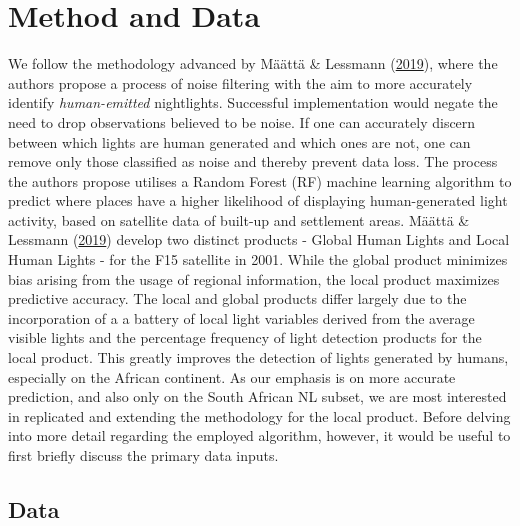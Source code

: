 \documentclass[11pt,preprint, authoryear]{elsarticle}
\numberwithin{equation}{section}
\numberwithin{figure}{section}
\numberwithin{table}{section}
\begin{document}
\hypertarget{method-and-data}{%
\section{\texorpdfstring{Method and Data
\label{Methodology}}{Method and Data }}\label{method-and-data}}

We follow the methodology advanced by Määttä \& Lessmann
(\protect\hyperlink{ref-maatta}{2019}), where the authors propose a
process of noise filtering with the aim to more accurately identify
\emph{human-emitted} nightlights. Successful implementation would negate
the need to drop observations believed to be noise. If one can
accurately discern between which lights are human generated and which
ones are not, one can remove only those classified as noise and thereby
prevent data loss. The process the authors propose utilises a Random
Forest (RF) machine learning algorithm to predict where places have a
higher likelihood of displaying human-generated light activity, based on
satellite data of built-up and settlement areas. Määttä \& Lessmann
(\protect\hyperlink{ref-maatta}{2019}) develop two distinct products -
Global Human Lights and Local Human Lights - for the F15 satellite in
2001. While the global product minimizes bias arising from the usage of
regional information, the local product maximizes predictive accuracy.
The local and global products differ largely due to the incorporation of
a a battery of local light variables derived from the average visible
lights and the percentage frequency of light detection products for the
local product. This greatly improves the detection of lights generated
by humans, especially on the African continent. As our emphasis is on
more accurate prediction, and also only on the South African NL subset,
we are most interested in replicated and extending the methodology for
the local product. Before delving into more detail regarding the
employed algorithm, however, it would be useful to first briefly discuss
the primary data inputs.

\hypertarget{data}{%
\subsection*{Data}\label{data}}
\end{document}
